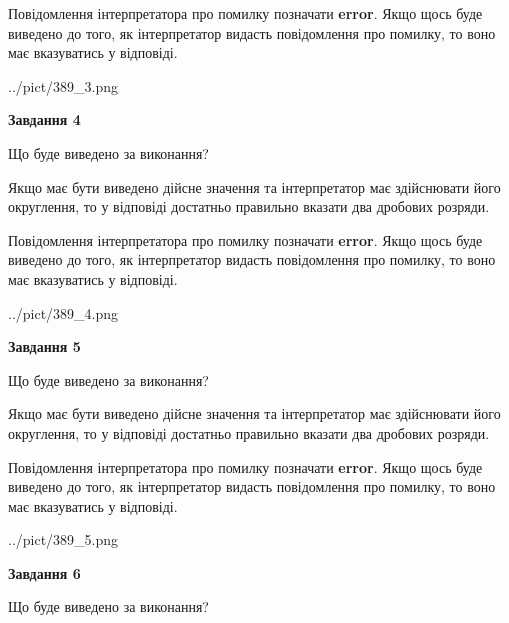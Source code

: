 \documentclass[12pt, ukrainian]{article}
\begin{document}
{\begin {Large}
Повідомлення інтерпретатора про помилку позначати \textbf{error}.
Якщо щось буде виведено до того, як інтерпретатор видасть повідомлення про помилку, 
то воно має вказуватись у відповіді. \par

\begin{center}
	{../pict/389_3.png}
\end{center}
\newpage

{\begin {center}\textbf{Завдання 4}\end {center}}\par
Що буде виведено за виконання? \par

Якщо має бути виведено дійсне значення та інтерпретатор має здійснювати його округлення, 
то у відповіді достатньо правильно вказати два дробових розряди.

Повідомлення інтерпретатора про помилку позначати \textbf{error}.
Якщо щось буде виведено до того, як інтерпретатор видасть повідомлення про помилку, 
то воно має вказуватись у відповіді. \par

\begin{center}
	{../pict/389_4.png}
\end{center}
\newpage

{\begin {center}\textbf{Завдання 5}\end {center}}\par
Що буде виведено за виконання? \par

Якщо має бути виведено дійсне значення та інтерпретатор має здійснювати його округлення, 
то у відповіді достатньо правильно вказати два дробових розряди.

Повідомлення інтерпретатора про помилку позначати \textbf{error}.
Якщо щось буде виведено до того, як інтерпретатор видасть повідомлення про помилку, 
то воно має вказуватись у відповіді. \par

\begin{center}
	{../pict/389_5.png}
\end{center}
\newpage

{\begin {center}\textbf{Завдання 6}\end {center}}\par
Що буде виведено за виконання? \par


\end{Large}}
\end{document}
